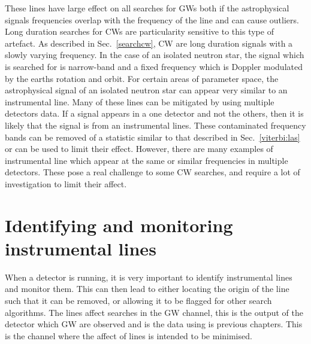 These lines have large effect on all searches for \acp{GW} both if the astrophysical signals frequencies overlap with the frequency of the line and can cause outliers. 
Long duration searches for \acp{CW} are particularity sensitive to this type of artefact.
As described in Sec.~\ref{searchcw}, \ac{CW} are long duration signals with a slowly varying frequency.
In the case of an isolated neutron star, the signal which is searched for is narrow-band and a fixed frequency which is Doppler modulated by the earths rotation and orbit.
For certain areas of parameter space, the astrophysical signal of an isolated neutron star can appear very similar to an instrumental line. 
Many of these lines can be mitigated by using multiple detectors data. If a signal appears in a one detector and not the others, then it is likely that the signal is from an instrumental lines. 
These contaminated frequency bands can be removed of a statistic similar to that described in Sec.~\ref{viterbi:las} or \citep{keitel2014SearchContinuous} can be used to limit their effect.
However, there are many examples of instrumental line which appear at the same or similar frequencies in multiple detectors.
These pose a real challenge to some \ac{CW} searches, and require a lot of investigation to limit their affect.

\section{\label{detchar:monitor}Identifying and monitoring instrumental lines}

%

When a detector is running, it is very important to identify instrumental lines and monitor them.
This can then lead to either locating the origin of the line such that it can be removed, or allowing it to be flagged for other search algorithms.
The lines affect searches in the \ac{GW} channel, this is the output of the detector which \ac{GW} are observed and is the data using is previous chapters.
This is the channel where the affect of lines is intended to be minimised.

